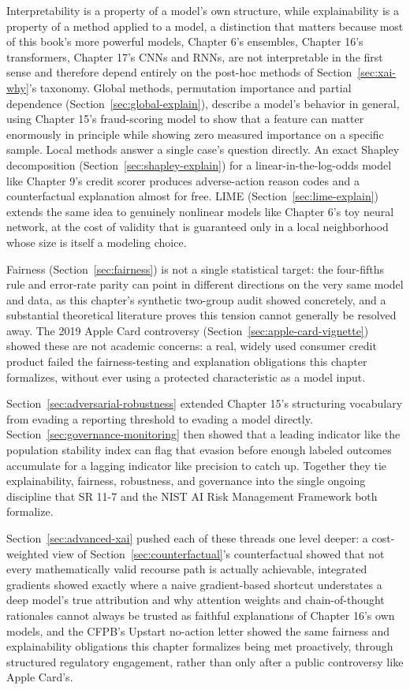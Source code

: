 \documentclass[../ai_in_finance]{subfiles}
\begin{document}
Interpretability is a property of a model's own structure, while explainability is a property of a method applied to a model, a distinction that matters because most of this book's more powerful models, Chapter 6's ensembles, Chapter 16's transformers, Chapter 17's CNNs and RNNs, are not interpretable in the first sense and therefore depend entirely on the post-hoc methods of Section~\ref{sec:xai-why}'s taxonomy. Global methods, permutation importance and partial dependence (Section~\ref{sec:global-explain}), describe a model's behavior in general, using Chapter 15's fraud-scoring model to show that a feature can matter enormously in principle while showing zero measured importance on a specific sample. Local methods answer a single case's question directly. An exact Shapley decomposition (Section~\ref{sec:shapley-explain}) for a linear-in-the-log-odds model like Chapter 9's credit scorer produces adverse-action reason codes and a counterfactual explanation almost for free. LIME (Section~\ref{sec:lime-explain}) extends the same idea to genuinely nonlinear models like Chapter 6's toy neural network, at the cost of validity that is guaranteed only in a local neighborhood whose size is itself a modeling choice.

Fairness (Section~\ref{sec:fairness}) is not a single statistical target: the four-fifths rule and error-rate parity can point in different directions on the very same model and data, as this chapter's synthetic two-group audit showed concretely, and a substantial theoretical literature proves this tension cannot generally be resolved away. The 2019 Apple Card controversy (Section~\ref{sec:apple-card-vignette}) showed these are not academic concerns: a real, widely used consumer credit product failed the fairness-testing and explanation obligations this chapter formalizes, without ever using a protected characteristic as a model input.

Section~\ref{sec:adversarial-robustness} extended Chapter 15's structuring vocabulary from evading a reporting threshold to evading a model directly. Section~\ref{sec:governance-monitoring} then showed that a leading indicator like the population stability index can flag that evasion before enough labeled outcomes accumulate for a lagging indicator like precision to catch up. Together they tie explainability, fairness, robustness, and governance into the single ongoing discipline that SR 11-7 and the NIST AI Risk Management Framework both formalize.

Section~\ref{sec:advanced-xai} pushed each of these threads one level deeper: a cost-weighted view of Section~\ref{sec:counterfactual}'s counterfactual showed that not every mathematically valid recourse path is actually achievable, integrated gradients showed exactly where a naive gradient-based shortcut understates a deep model's true attribution and why attention weights and chain-of-thought rationales cannot always be trusted as faithful explanations of Chapter 16's own models, and the CFPB's Upstart no-action letter showed the same fairness and explainability obligations this chapter formalizes being met proactively, through structured regulatory engagement, rather than only after a public controversy like Apple Card's.
\end{document}

